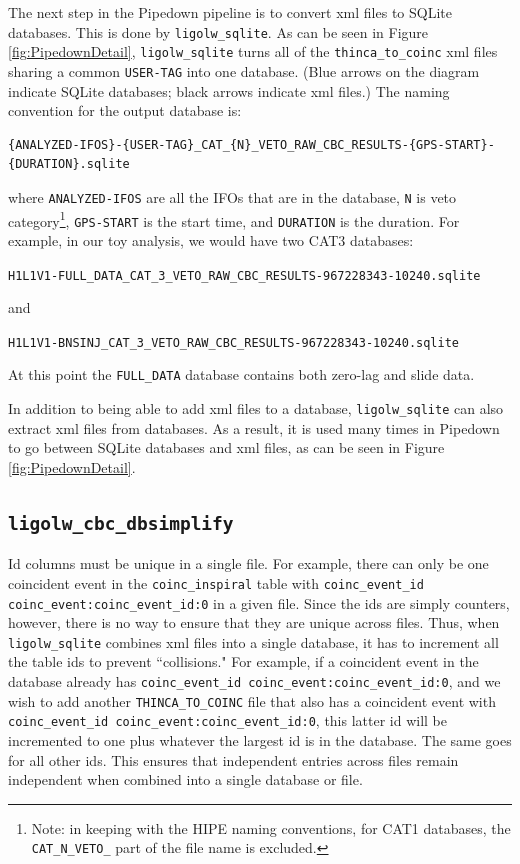 The next step in the Pipedown pipeline is to convert xml files to SQLite databases. This is done by \texttt{ligolw\_sqlite}. As can be seen in Figure \ref{fig:PipedownDetail}, \texttt{ligolw\_sqlite} turns all of the \texttt{thinca\_to\_coinc} xml files sharing a common \texttt{USER-TAG} into one database. (Blue arrows on the diagram indicate SQLite databases; black arrows indicate xml files.) The naming convention for the output database is:
\begin{center}
\begin{footnotesize}
\begin{verbatim}
{ANALYZED-IFOS}-{USER-TAG}_CAT_{N}_VETO_RAW_CBC_RESULTS-{GPS-START}-{DURATION}.sqlite
\end{verbatim}
\end{footnotesize}
\end{center}
where \texttt{ANALYZED-IFOS} are all the \acp{IFO} that are in the database, \texttt{N} is veto category\footnote{Note: in keeping with the \ac{HIPE} naming conventions, for CAT1 databases, the \texttt{CAT\_N\_VETO\_} part of the file name is excluded.}, \texttt{GPS-START} is the \ihope start time, and \texttt{DURATION} is the \ihope duration. For example, in our toy analysis, we would have two CAT3 databases:
\begin{center}
\verb|H1L1V1-FULL_DATA_CAT_3_VETO_RAW_CBC_RESULTS-967228343-10240.sqlite|
\end{center}
and
\begin{center}
\verb|H1L1V1-BNSINJ_CAT_3_VETO_RAW_CBC_RESULTS-967228343-10240.sqlite|
\end{center}
At this point the \texttt{FULL\_DATA} database contains both zero-lag and slide data.

In addition to being able to add xml files to a database, \texttt{ligolw\_sqlite} can also extract xml files from databases. As a result, it is used many times in Pipedown to go between SQLite databases and xml files, as can be seen in Figure \ref{fig:PipedownDetail}.

\subsection{\texttt{ligolw\_cbc\_dbsimplify}}

Id columns must be unique in a single file. For example, there can only be one coincident event in the \verb|coinc_inspiral| table with \verb|coinc_event_id coinc_event:coinc_event_id:0| in a given file. Since the ids are simply counters, however, there is no way to ensure that they are unique across files. Thus, when \verb|ligolw_sqlite| combines xml files into a single database, it has to increment all the table ids to prevent ``collisions." For example, if a coincident event in the database already has \verb|coinc_event_id coinc_event:coinc_event_id:0|, and we wish to add another \verb|THINCA_TO_COINC| file that also has a coincident event with \verb|coinc_event_id coinc_event:coinc_event_id:0|, this latter id will be incremented to one plus whatever the largest id is in the database. The same goes for all other ids. This ensures that independent entries across files remain independent when combined into a single database or file.

